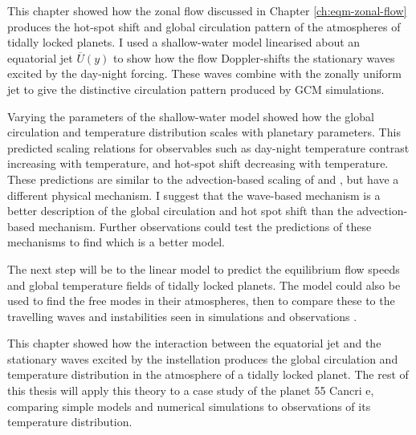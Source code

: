 This chapter showed how the zonal flow discussed in Chapter \ref{ch:eqm-zonal-flow} produces the hot-spot shift and global circulation pattern of the atmospheres of tidally locked planets. I used a shallow-water model linearised about an equatorial jet $\overline{U}(y)$ to show how the flow Doppler-shifts the stationary waves excited by the day-night forcing. These waves combine with the zonally uniform jet to give the distinctive circulation pattern produced by GCM simulations.

Varying the parameters of the shallow-water model showed how the global circulation and temperature distribution scales with planetary parameters. This predicted scaling relations for observables such as day-night temperature contrast increasing with temperature, and hot-spot shift decreasing with temperature. These predictions are similar to the advection-based scaling of \citet{komacek2017daynightII} and \citet{zhang2017dynamics}, but have a different physical mechanism. I suggest that the wave-based mechanism is a better description of the global circulation and hot spot shift than the advection-based mechanism. Further observations could test the predictions of these mechanisms to find which is a better model.

The next step will be to the linear model to predict the equilibrium flow speeds and global temperature fields of tidally locked planets. The model could also be used to find the free modes in their atmospheres, then to compare these to the travelling waves and instabilities seen in simulations and observations \citep{pierrehumbert2018review, armstrong2017variability}.

This chapter showed how the interaction between the equatorial jet and the stationary waves excited by the instellation produces the global circulation and temperature distribution in the atmosphere of a tidally locked planet. The rest of this thesis will apply this theory to a case study of the planet 55 Cancri e, comparing simple models and numerical simulations to observations of its temperature distribution.







% 
% 
